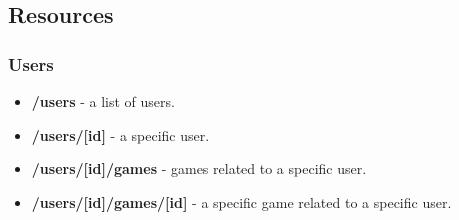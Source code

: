\subsection{Resources}
\subsubsection{Users}
\begin{itemize}
	\item \textbf{/users} - a list of users.
	\item \textbf{/users/[id]} - a specific user.
	\item \textbf{/users/[id]/games} - games related to a specific user.
	\item \textbf{/users/[id]/games/[id]} - a specific game related to a specific user.
\end{itemize}
